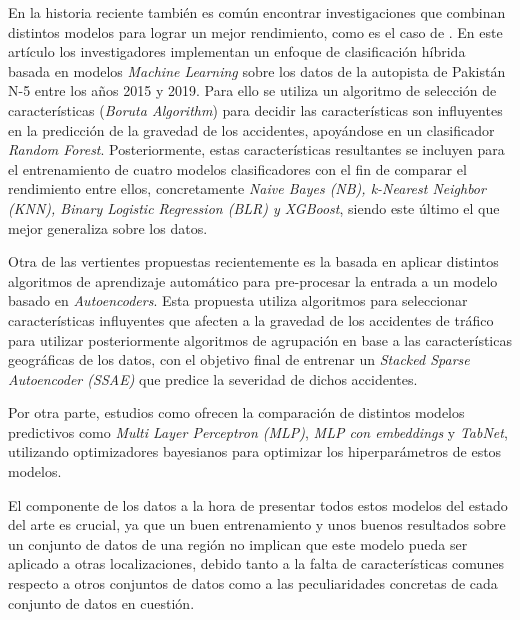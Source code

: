 En la historia reciente también es común encontrar investigaciones que combinan distintos modelos para lograr un mejor rendimiento, como es el caso de \cite{zhang2022hybrid}. En este artículo los investigadores implementan un enfoque de clasificación híbrida basada en modelos \textit{Machine Learning} sobre los datos de la autopista de Pakistán N-5 entre los años 2015 y 2019. Para ello se utiliza un algoritmo de selección de características (\textit{Boruta Algorithm}) para decidir las características son influyentes en la predicción de la gravedad de los accidentes, apoyándose en un clasificador \textit{Random Forest}. Posteriormente, estas características resultantes se incluyen para el entrenamiento de cuatro modelos clasificadores con el fin de comparar el rendimiento entre ellos, concretamente \textit{Naive Bayes (NB), k-Nearest Neighbor (KNN), Binary Logistic Regression (BLR) y XGBoost}, siendo este último el que mejor generaliza sobre los datos.





Otra de las vertientes propuestas recientemente es la basada en aplicar distintos algoritmos de aprendizaje automático para pre-procesar la entrada a un modelo basado en \textit{Autoencoders}. Esta propuesta utiliza algoritmos para seleccionar características influyentes que afecten a la gravedad de los accidentes de tráfico para utilizar posteriormente algoritmos de agrupación en base a las características geográficas de los datos, con el objetivo final de entrenar un \textit{Stacked Sparse Autoencoder (SSAE)} \cite{ma2021analytic} que predice la severidad de dichos accidentes.

Por otra parte, estudios como \cite{Sattar2023} ofrecen la comparación de distintos modelos predictivos como \textit{Multi Layer Perceptron (MLP)}, \textit{MLP con embeddings} y \textit{TabNet}, utilizando optimizadores bayesianos para optimizar los hiperparámetros de estos modelos.

El componente de los datos a la hora de presentar todos estos modelos del estado del arte es crucial, ya que un buen entrenamiento y unos buenos resultados sobre un conjunto de datos de una región no implican que este modelo pueda ser aplicado a otras localizaciones, debido tanto a la falta de características comunes respecto a otros conjuntos de datos como a las peculiaridades concretas de cada conjunto de datos en cuestión.

